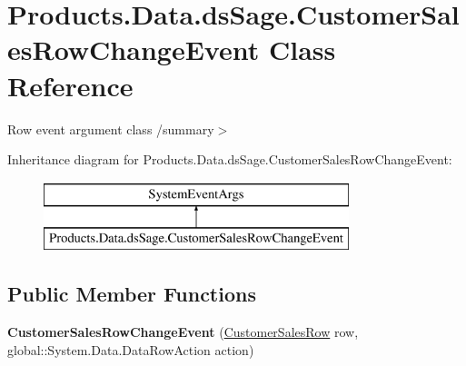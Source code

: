 \hypertarget{class_products_1_1_data_1_1ds_sage_1_1_customer_sales_row_change_event}{}\section{Products.\+Data.\+ds\+Sage.\+Customer\+Sales\+Row\+Change\+Event Class Reference}
\label{class_products_1_1_data_1_1ds_sage_1_1_customer_sales_row_change_event}


Row event argument class /summary$>$  


Inheritance diagram for Products.\+Data.\+ds\+Sage.\+Customer\+Sales\+Row\+Change\+Event\+:\begin{figure}[H]
\begin{center}
\leavevmode
\includegraphics[height=2.000000cm]{class_products_1_1_data_1_1ds_sage_1_1_customer_sales_row_change_event}
\end{center}
\end{figure}
\subsection*{Public Member Functions}
\begin{DoxyCompactItemize}
\item 
{\bfseries Customer\+Sales\+Row\+Change\+Event} (\hyperlink{class_products_1_1_data_1_1ds_sage_1_1_customer_sales_row}{Customer\+Sales\+Row} row, global\+::\+System.\+Data.\+Data\+Row\+Action action)\hypertarget{class_products_1_1_data_1_1ds_sage_1_1_customer_sales_row_change_event_ab874899378186f41805cce8de0bbd209}{}\label{class_products_1_1_data_1_1ds_sage_1_1_customer_sales_row_change_event_ab874899378186f41805cce8de0bbd209}

\end{DoxyCompactItemize}
